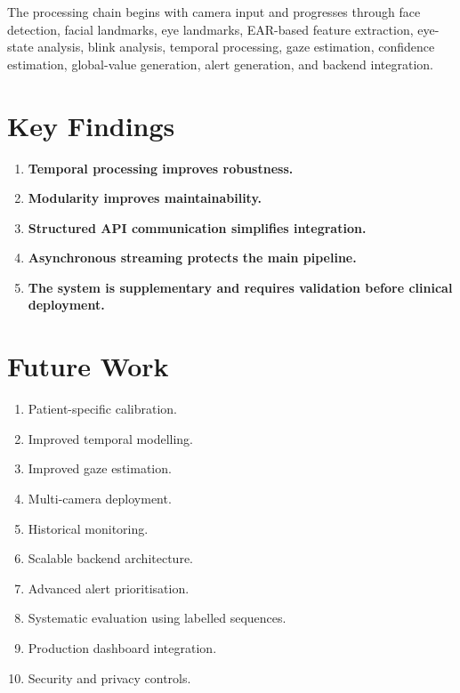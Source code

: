 \documentclass{tietreport}
\begin{document}
The processing chain begins with camera input and progresses through
face detection, facial landmarks, eye landmarks, EAR-based feature
extraction, eye-state analysis, blink analysis, temporal processing,
gaze estimation, confidence estimation, global-value generation,
alert generation, and backend integration.


\section{Key Findings}

\begin{enumerate}

    \item \textbf{Temporal processing improves robustness.}

    \item \textbf{Modularity improves maintainability.}

    \item \textbf{Structured API communication simplifies integration.}

    \item \textbf{Asynchronous streaming protects the main pipeline.}

    \item \textbf{The system is supplementary and requires validation
    before clinical deployment.}

\end{enumerate}


\section{Future Work}

\begin{enumerate}

    \item Patient-specific calibration.

    \item Improved temporal modelling.

    \item Improved gaze estimation.

    \item Multi-camera deployment.

    \item Historical monitoring.

    \item Scalable backend architecture.

    \item Advanced alert prioritisation.

    \item Systematic evaluation using labelled sequences.

    \item Production dashboard integration.

    \item Security and privacy controls.

\end{enumerate}
\end{document}
